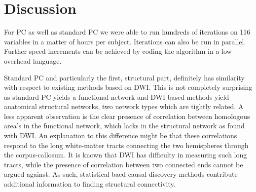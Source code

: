 \documentclass[a4paper, 10pt, english, onecolumn]{article}
\makeatletter
\renewcommand{\paragraph}{%
  \@startsection{paragraph}{4}%
  {\z@}{0.5ex \@plus 1ex \@minus .2ex}{-1em}%
  {\normalfont\normalsize\bfseries}%
}
\makeatother
\begin{document}


\section{Discussion}



For PC as well as standard PC we were able to run hundreds of iterations on 116 variables in a matter of hours per subject.
Iterations can also be run in parallel.
Further speed increments can be achieved by coding the algorithm in a low overhead language.

Standard PC and particularly the first, structural part, definitely has similarity with respect to existing methods based on DWI.
This is not completely surprising as standard PC yields a functional network and DWI based methods yield anatomical structural networks, two network types which are tightly related.
A less apparent observation is the clear presence of correlation between homologous area's in the functional network, which lacks in the structural network as found with DWI.
An explanation to this difference might be that these correlations respond to the long white-matter tracts connecting the two hemispheres through the corpus-callosum.
It is known that DWI has difficulty in measuring such long tracts, while the presence of correlation between two connected ends cannot be argued against.
As such, statistical baed causal discovery methods contribute additional information to finding structural connectivity.
\end{document}
